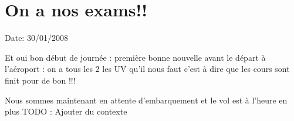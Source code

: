 \section{On a nos exams!!}

Date: 30/01/2008

\begin{multicols}{2}

Et oui bon début de journée : première bonne nouvelle avant le départ à l'aéroport : on a tous les 2 les UV qu'il nous faut c'est à dire que les cours sont finit pour de bon !!!

Nous sommes maintenant en attente d'embarquement et le vol est à l'heure en plus
TODO : Ajouter du contexte

\end{multicols}

